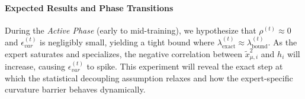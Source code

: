 \documentclass[11pt]{article}
\begin{document}
\paragraph{Expected Results and Phase Transitions}
During the \emph{Active Phase} (early to mid-training), we hypothesize that $\rho^{(t)} \approx 0$ and $\epsilon_{var}^{(t)}$ is negligibly small, yielding a tight bound where $\lambda_{\text{exact}}^{(t)} \approx \lambda_{\text{bound}}^{(t)}$. As the expert saturates and specializes, the negative correlation between $\tilde{x}_{\mu,i}^2$ and $h_i$ will increase, causing $\epsilon_{var}^{(t)}$ to spike. This experiment will reveal the exact step at which the statistical decoupling assumption relaxes and how the expert-specific curvature barrier behaves dynamically.
\end{document}
